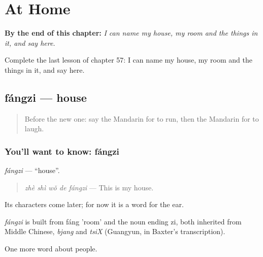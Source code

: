 
\chapter{At Home}
\label{ch:zh-at-home}

\begin{chapteropening}
\textbf{By the end of this chapter:} \emph{I can name my house, my room and the things in it, and say here.}

Complete the last lesson of chapter 57: I can name my house, my room and the things in it, and say here.
\end{chapteropening}

\section[fángzi]{fángzi — house}

\label{lesson:ZH-C57-fangzi}



\begin{quote}
Before the new one: say the Mandarin for to run, then the Mandarin for to laugh.
\end{quote}

\subsection*{You'll want to know: fángzi}
\emph{fángzi} — \textquotedblleft{}house\textquotedblright{}.

\begin{quote}
\emph{zhè shì wǒ de fángzi} — This is my house.
\end{quote}

Its characters come later; for now it is a word for the ear.

\begin{cousinweb}
\emph{fángzi} is built from fáng 'room' and the noun ending zi, both inherited from Middle Chinese, \emph{bjang} and \emph{tsiX} (Guangyun, in Baxter's transcription).
\end{cousinweb}

\begin{grammarlens}[title={What you've built}]
One more word about people.
\end{grammarlens}

